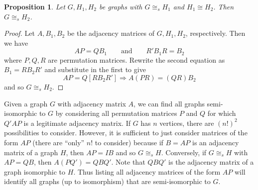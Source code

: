 \documentclass[12pt]{article}
\newcommand{\iso}{\cong}
\newcommand{\siso}{\ensuremath{\iso_s}}
\newtheorem{prop}{Proposition}
\begin{document}
\begin{prop}
  Let $G,H_1,H_2$ be graphs with $G\siso H_1$ and $H_1 \iso H_2$. Then
  $G\siso H_2$. 
\end{prop}

\begin{proof}
  Let $A,B_1,B_2$ be the adjacency matrices of $G, H_1, H_2$,
  respectively. Then we have
  \[
  AP = QB_1 \qquad\text{and}\qquad R' B_1 R = B_2
  \]
  where $P,Q,R$ are permutation matrices. Rewrite the second equation
  as $B_1= R B_2 R'$ and substitute in the first to give
  \[
  AP = Q[R B_2 R'] \Rightarrow A(PR)= (QR) B_2
  \]
  and so $G \siso H_2$.
\end{proof}


Given a graph $G$ with adjacency matrix $A$, we can find all graphs
semi-isomorphic to $G$ by considering all permutation matrices $P$ and
$Q$ for which $Q'AP$ is a legitimate adjacency matrix. If $G$ has $n$
vertices, there are $(n!)^2$ possibilities to consider. However, it is
sufficient to just consider matrices of the form $AP$ (there are
``only'' $n!$ to consider) because if $B=AP$ is an adjacency matrix of
a graph $H$, then $AP = IB$ and so $G\siso H$. Conversely, if $G \siso
H$ with $AP=QB$, then $A(PQ') = QBQ'$. Note that $QBQ'$ is the
adjacency matrix of a graph isomorphic to $H$. Thus listing all
adjacency matrices of the form $AP$ will identify all graphs (up to
isomorphism) that are semi-isomorphic to $G$.
\end{document}
